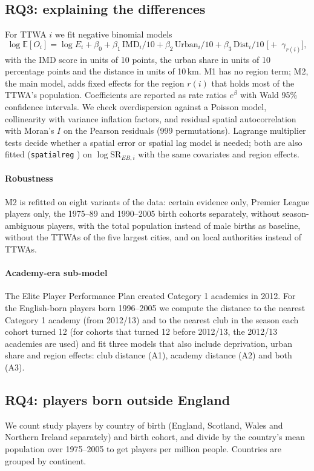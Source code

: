 \subsection{RQ3: explaining the differences}
\label{sec:models}
For TTWA $i$ we fit negative binomial models \cite{venables2002}
\begin{equation}
\log \mathbb{E}[O_i] = \log E_i + \beta_0 + \beta_1\,\mathrm{IMD}_i/10 + \beta_2\,\mathrm{Urban}_i/10 + \beta_3\,\mathrm{Dist}_i/10 \;\bigl[+\; \gamma_{r(i)}\bigr],
\end{equation}
with the IMD score in units of 10 points, the urban share in units of 10 percentage points and the distance in units of 10\,km. M1 has no region term; M2, the main model, adds fixed effects for the region $r(i)$ that holds most of the TTWA's population. Coefficients are reported as rate ratios $e^{\beta}$ with Wald 95\% confidence intervals. We check overdispersion against a Poisson model, collinearity with variance inflation factors, and residual spatial autocorrelation with Moran's $I$ on the Pearson residuals (999 permutations). Lagrange multiplier tests \cite{anselin1988} decide whether a spatial error or spatial lag model is needed; both are also fitted (\texttt{spatialreg} \cite{bivand2015}) on $\log \mathrm{SR}_{EB,i}$ with the same covariates and region effects.

\paragraph{Robustness} M2 is refitted on eight variants of the data: certain evidence only, Premier League players only, the 1975--89 and 1990--2005 birth cohorts separately, without season-ambiguous players, with the total population instead of male births as baseline, without the TTWAs of the five largest cities, and on local authorities instead of TTWAs.

\paragraph{Academy-era sub-model} The Elite Player Performance Plan created Category 1 academies in 2012. For the \nAcadPlayers{} English-born players born 1996--2005 we compute the distance to the nearest Category 1 academy (from 2012/13) and to the nearest club in the season each cohort turned 12 (for cohorts that turned 12 before 2012/13, the 2012/13 academies are used) and fit three models that also include deprivation, urban share and region effects: club distance (A1), academy distance (A2) and both (A3).

\subsection{RQ4: players born outside England}
We count study players by country of birth (England, Scotland, Wales and Northern Ireland separately) and birth cohort, and divide by the country's mean population over 1975--2005 to get players per million people. Countries are grouped by continent.
